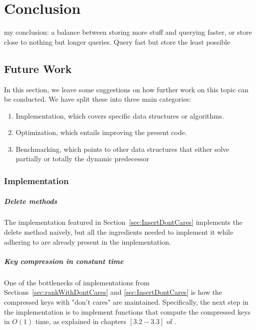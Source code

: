 \chapter{Conclusion}

my conclusion: a balance between storing more stuff and querying faster, or store close to nothing but longer queries. Query fast but store the least possible

\section{Future Work}
In this section, we leave some suggestions on how further work on this topic can be conducted. We have split these into three main categories:
\begin{enumerate}
    \item
    Implementation, which covers specific data structures or algorithms.
    
    \item
    Optimization, which entails improving the present code.
    
    \item
    Benchmarking, which points to other data structures that either solve partially or totally the dynamic predecessor 
    
\end{enumerate}

\subsection{Implementation}

\paragraph*{Delete methods} The implementation featured in Section~\ref{sec:InsertDontCares} implements the {\ttfamily delete} method naively, but all the ingredients needed to implement it while adhering to \cite{patrascu2014dynamic} are already present in the implementation.

\paragraph*{Key compression in constant time} One of the bottlenecks of implementations from Sections~\ref{sec:rankWithDontCares} and \ref{sec:InsertDontCares} is how the compressed keys with "don't cares" are maintained. Specifically, the next step in the implementation is to implement functions that compute the compressed keys in $O(1)$ time, as explained in chapters $[3.2 - 3.3]$ of \cite{patrascu2014dynamic}.

